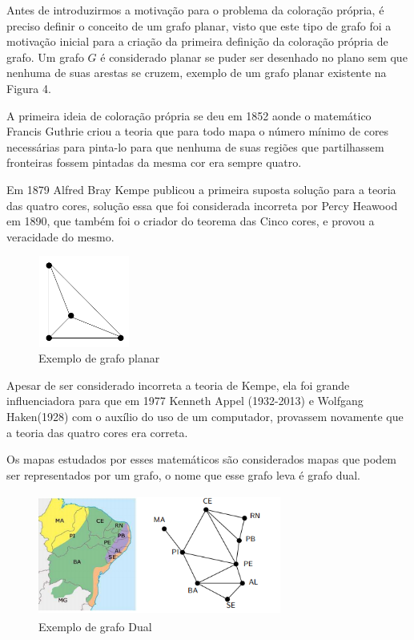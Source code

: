 \documentclass[12pt]{article}
\begin{document}
	Antes de introduzirmos a motivação para o problema da coloração própria, é preciso definir o conceito de um grafo planar, visto que este tipo de grafo foi a motivação inicial para a criação da primeira definição da coloração própria de grafo.
	Um grafo $G$ é considerado planar se puder ser desenhado no plano sem que nenhuma de suas arestas se cruzem, exemplo de um grafo planar existente na Figura 4.
	
	
	A primeira ideia de coloração própria se deu em 1852 aonde o matemático Francis Guthrie criou a teoria que para todo mapa o número mínimo de cores necessárias para pinta-lo para que nenhuma de suas regiões que partilhassem fronteiras fossem pintadas da mesma cor era sempre quatro.
	
	
	Em 1879 Alfred Bray Kempe publicou a primeira suposta solução para a teoria das quatro cores, solução essa que foi considerada incorreta por Percy Heawood em 1890, que também foi o criador do teorema das Cinco cores, e provou a veracidade do mesmo.
	
	\begin{figure}[!htb]
		\centering
		\includegraphics[width=3cm, height=3cm]{grafoPlanar}
		\caption{Exemplo de grafo planar}    
	\end{figure}
	
	Apesar de ser considerado incorreta a teoria de Kempe, ela foi grande influenciadora para que em 1977 Kenneth Appel (1932-2013) e Wolfgang Haken(1928) com o auxílio do uso de um computador, provassem novamente que a teoria das quatro cores era correta.
	
	Os mapas estudados por esses matemáticos são considerados mapas que podem ser representados por um grafo, o nome que esse grafo leva é grafo dual. 
	
	\begin{figure}[!htb]
		\centering
		\includegraphics[width=8cm,height=4cm]{grafoDual}
		\caption{Exemplo de grafo Dual}    
	\end{figure}
	
\end{document}
